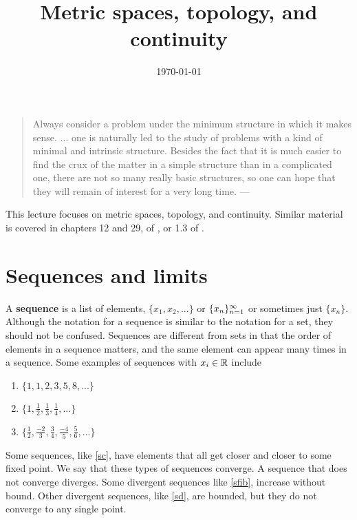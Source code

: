  


\title{Metric spaces, topology, and continuity}
\date{\today}



\maketitle

\begin{quotation}
  Always consider a problem under the minimum structure in which it
  makes sense. ... one is naturally led to the study of problems with
  a kind of minimal and intrinsic structure. Besides the fact that it
  is much easier to find the crux of the matter in a simple structure
  than in a complicated one, there are not so many really basic
  structures, so one can hope that they will remain of interest for a
  very long time. --- \cite{talagrand2005}
\end{quotation}

This lecture focuses on metric spaces, topology, and continuity.
Similar material is covered in chapters 12 and 29, of \cite{sb1994}, or
1.3 of \cite{carter2001}.

\section{Sequences and limits}

A \textbf{sequence} is a list of elements, $\{x_1, x_2, ... \}$ or
$\{{x}_n \}_{n=1}^\infty$ or sometimes just $\{x_n\}$. Although the notation for a
sequence is similar to the notation for a set, they should not be
confused. Sequences are different from sets in that the order of
elements in a sequence matters, and the same element can appear many
times in a sequence.  Some examples of sequences with $x_i \in \mathbb{R}$
include
\begin{enumerate}
\item\label{sfib} $\{ 1, 1, 2, 3, 5, 8, ... \}$
\item\label{sc} $\{ 1, \frac{1}{2}, \frac{1}{3}, \frac{1}{4}, ... \}$
\item\label{sd} $\{\frac{1}{2}, \frac{-2}{3}, \frac{3}{4}, \frac{-4}{5},
  \frac{5}{6}, ... \}$
\end{enumerate}
Some sequences, like \ref{sc}, have elements that all get closer and
closer to some fixed point. We say that these types of sequences
converge. A sequence that does not converge diverges. Some divergent
sequences like \ref{sfib}, increase without bound. Other divergent
sequences, like \ref{sd}, are bounded, but they do not converge to any
single point. 

